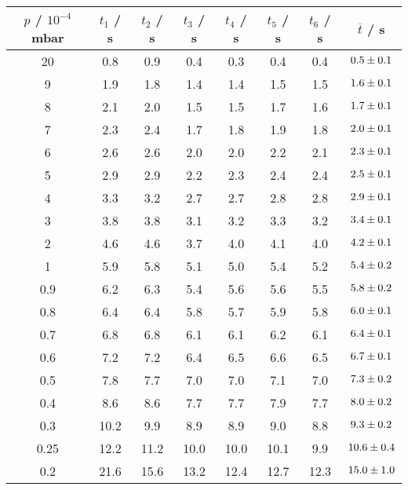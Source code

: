 \begin{table} %
  \centering
  \caption{}
  \label{tab:}
  \begin{tabular}{c|c|c|c|c|c|c|c}
    $p$ / $10^{-4}$ mbar & $t_1$ / s & $t_2$ / s & $t_3$ / s & $t_4$ / s & $t_5$ / s & $t_6$ / s & $\overline{t}$ / s \\
    \hline
    20   & 0.8  & 0.9  & 0.4  & 0.3  & 0.4  & 0.4  & $\num{0.5 +- 0.1}$ \\
    9    & 1.9  & 1.8  & 1.4  & 1.4  & 1.5  & 1.5  & $\num{1.6 +- 0.1}$ \\
    8    & 2.1  & 2.0  & 1.5  & 1.5  & 1.7  & 1.6  & $\num{1.7 +- 0.1}$ \\
    7    & 2.3  & 2.4  & 1.7  & 1.8  & 1.9  & 1.8  & $\num{2.0 +- 0.1}$ \\
    6    & 2.6  & 2.6  & 2.0  & 2.0  & 2.2  & 2.1  & $\num{2.3 +- 0.1}$ \\
    5    & 2.9  & 2.9  & 2.2  & 2.3  & 2.4  & 2.4  & $\num{2.5 +- 0.1}$ \\
    4    & 3.3  & 3.2  & 2.7  & 2.7  & 2.8  & 2.8  & $\num{2.9 +- 0.1}$ \\
    3    & 3.8  & 3.8  & 3.1  & 3.2  & 3.3  & 3.2  & $\num{3.4 +- 0.1}$ \\
    2    & 4.6  & 4.6  & 3.7  & 4.0  & 4.1  & 4.0  & $\num{4.2 +- 0.1}$ \\
    1    & 5.9  & 5.8  & 5.1  & 5.0  & 5.4  & 5.2  & $\num{5.4 +- 0.2}$ \\
    0.9  & 6.2  & 6.3  & 5.4  & 5.6  & 5.6  & 5.5  & $\num{5.8 +- 0.2}$ \\
    0.8  & 6.4  & 6.4  & 5.8  & 5.7  & 5.9  & 5.8  & $\num{6.0 +- 0.1}$ \\
    0.7  & 6.8  & 6.8  & 6.1  & 6.1  & 6.2  & 6.1  & $\num{6.4 +- 0.1}$ \\
    0.6  & 7.2  & 7.2  & 6.4  & 6.5  & 6.6  & 6.5  & $\num{6.7 +- 0.1}$ \\
    0.5  & 7.8  & 7.7  & 7.0  & 7.0  & 7.1  & 7.0  & $\num{7.3 +- 0.2}$ \\
    0.4  & 8.6  & 8.6  & 7.7  & 7.7  & 7.9  & 7.7  & $\num{8.0 +- 0.2}$ \\
    0.3  & 10.2 & 9.9  & 8.9  & 8.9  & 9.0  & 8.8  & $\num{9.3 +- 0.2}$ \\
    0.25 & 12.2 & 11.2 & 10.0 & 10.0 & 10.1 & 9.9  & $\num{10.6 +- 0.4}$ \\
    0.2  & 21.6 & 15.6 & 13.2 & 12.4 & 12.7 & 12.3 & $\num{15.0 +- 1.0}$ \\
  \end{tabular}
\end{table}


